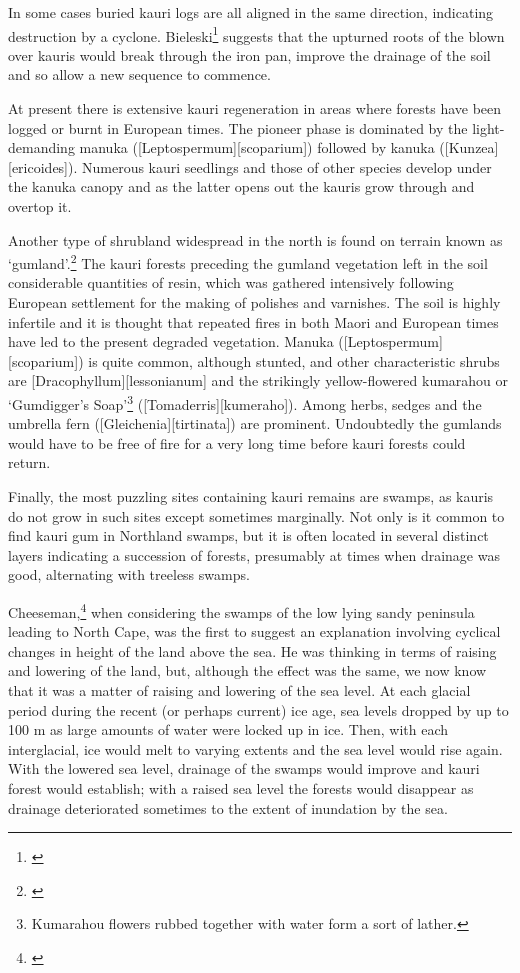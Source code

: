In some cases buried kauri logs are all aligned in the same direction, indicating destruction by a cyclone.
Bieleski\footnote{\cite{bieleski1959factors}} suggests that the upturned roots of the blown over kauris would break through the iron pan, improve the drainage of the soil and so allow a new sequence to commence.

At present there is extensive kauri regeneration in areas where forests have been logged or burnt in European times.
The pioneer phase is dominated by the light-demanding manuka ([Leptospermum][scoparium]) followed by kanuka ([Kunzea][ericoides]).
Numerous kauri seedlings and those of other species develop under the kanuka canopy and as the latter opens out the kauris grow through and overtop it.

Another type of shrubland widespread in the north is found on terrain known as `gumland'.\footnote{\cite{esler1975gumland}}
The kauri forests preceding the gumland vegetation left in the soil considerable quantities of resin, which was gathered intensively following European settlement for the making of polishes and varnishes.
The soil is highly infertile and it is thought that repeated fires in both Maori and European times have led to the present degraded vegetation.
Manuka ([Leptospermum][scoparium]) is quite common, although stunted, and other characteristic shrubs are [Dracophyllum][lessonianum] and the strikingly yellow-flowered kumarahou or `Gumdigger's Soap'\footnote{Kumarahou flowers rubbed together with water form a sort of lather.} ([Tomaderris][kumeraho]).
Among herbs, sedges and the umbrella fern ([Gleichenia][tirtinata]) are prominent.
Undoubtedly the gumlands would have to be free of fire for a very long time before kauri forests could return.

Finally, the most puzzling sites containing kauri remains are swamps, as kauris do not grow in such sites except sometimes marginally.
Not only is it common to find kauri gum in Northland swamps, but it is often located in several distinct layers indicating a succession of forests, presumably at times when drainage was good, alternating with treeless swamps.

Cheeseman,\footnote{\cite{cheeseman1896flora}} when considering the swamps of the low lying sandy peninsula leading to North Cape, was the first to suggest an explanation involving cyclical changes in height of the land above the sea.
He was thinking in terms of raising and lowering of the land, but, although the effect was the same, we now know that it was a matter of raising and lowering of the sea level.
At each glacial period during the recent (or perhaps current) ice age, sea levels dropped by up to 100 m as large amounts of water were locked up in ice.
Then, with each interglacial, ice would melt to varying extents and the sea level would rise again.
With the lowered sea level, drainage of the swamps would improve and kauri forest would establish; with a raised sea level the forests would disappear as drainage deteriorated sometimes to the extent of inundation by the sea.

